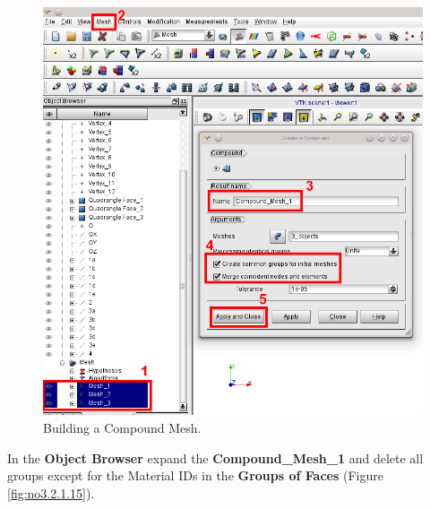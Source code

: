 \begin{figure}[h!]
\begin{center}
\includegraphics[scale=0.50]{figures/SalomeStep5.png}
\caption{Building a Compound Mesh.}
\label{fig:no3.2.1.13}
\end{center}
\end{figure}

In the \textbf{Object Browser} expand the \textbf{Compound\_Mesh\_1} and delete all groups except for the Material IDs in the \textbf{Groups of Faces} (Figure \ref{fig:no3.2.1.15}).
        
